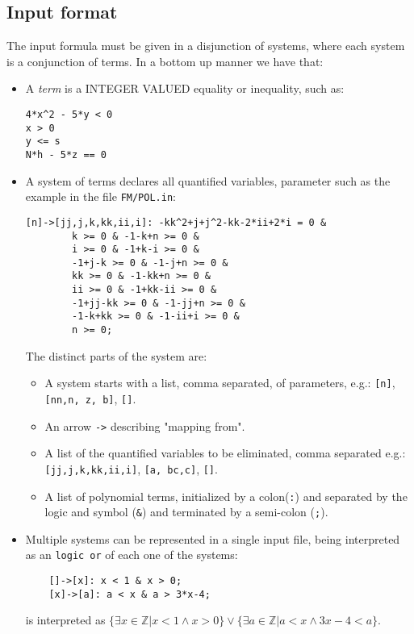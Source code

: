 \documentclass[12pt, a4paper]{report}
\begin{document}
\subsection{Input format}
The input formula must be given in a disjunction of systems, where each system is a conjunction of terms. In a bottom up manner we have that:
\begin{itemize}
	\item A \emph{term} is a INTEGER VALUED equality or inequality, such as:	\begin{verbatim}4*x^2 - 5*y < 0
x > 0
y <= s
N*h - 5*z == 0
	\end{verbatim}
	\item A system of terms declares all quantified variables, parameter such as the example in the file \texttt{FM/POL.in}:
	\begin{verbatim}[n]->[jj,j,k,kk,ii,i]: -kk^2+j+j^2-kk-2*ii+2*i = 0 &
		k >= 0 & -1-k+n >= 0 &
		i >= 0 & -1+k-i >= 0 &
		-1+j-k >= 0 & -1-j+n >= 0 &
		kk >= 0 & -1-kk+n >= 0 &
		ii >= 0 & -1+kk-ii >= 0 &
		-1+jj-kk >= 0 & -1-jj+n >= 0 &
		-1-k+kk >= 0 & -1-ii+i >= 0 &
		n >= 0;
		\end{verbatim}
		The distinct parts of the system are:
		\begin{itemize}
		\item A system starts with a list, comma separated, of parameters, e.g.: \texttt{[n]}, \texttt{[nn,n, z, b]}, \texttt{[]}.
		\item An arrow \texttt{->} describing "mapping from".
		\item A list of the quantified variables to be eliminated, comma separated e.g.: \texttt{[jj,j,k,kk,ii,i]}, \texttt{[a, bc,c]}, \texttt{[]}.
		\item A list of polynomial terms, initialized by a colon(\texttt{:}) and separated by the logic and symbol (\texttt{\&}) and terminated by a semi-colon (\texttt{;}).
	\end{itemize}

	\item Multiple systems can be represented in a single input file, being interpreted as an \texttt{logic or} of each one of the systems:
	\begin{verbatim}
	[]->[x]: x < 1 & x > 0;
	[x]->[a]: a < x & a > 3*x-4;
	\end{verbatim}
	is interpreted as $\{\exists x \in \mathbb{Z} | x < 1 \land x > 0\} \lor \{\exists a \in \mathbb{Z} | a < x \land 3x-4 < a\}$.
\end{itemize}
\end{document}
